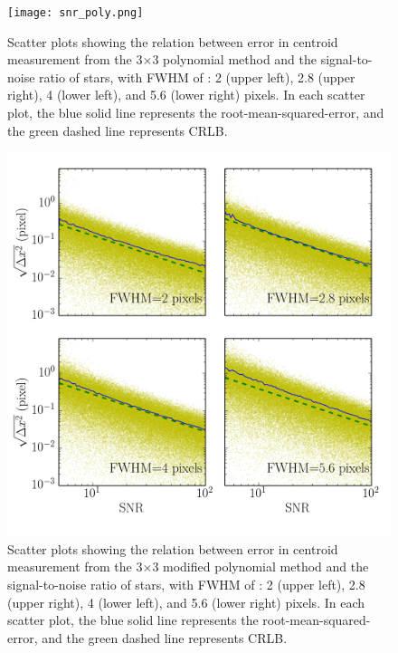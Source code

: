 \documentclass[12pt, preprint]{aastex}
\begin{document}
\clearpage


\begin{figure}[!htb]
  \texttt{[image: snr\_poly.png]}
\endminipage
\caption{Scatter plots showing the relation between error in centroid measurement from the 3$\times$3 polynomial method and the signal-to-noise ratio of stars, with FWHM of : 2 (upper left), 2.8 (upper right), 4 (lower left), and 5.6 (lower right) pixels. In each scatter plot, the blue solid line represents the root-mean-squared-error, and the green dashed line represents CRLB.}\label{1}
\end{figure}

\begin{figure}[!htb]
  \includegraphics[width=\linewidth]{snr_psfpix28poly.png}
\endminipage
\caption{Scatter plots showing the relation between error in centroid measurement from the 3$\times$3 modified polynomial method and the signal-to-noise ratio of stars, with FWHM of : 2 (upper left), 2.8 (upper right), 4 (lower left), and 5.6 (lower right) pixels. In each scatter plot, the blue solid line represents the root-mean-squared-error, and the green dashed line represents CRLB.}\label{2}
\end{figure}
\end{document}
